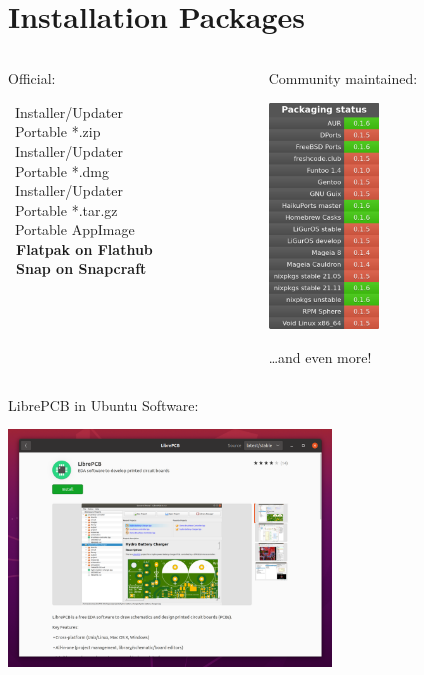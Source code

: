 \section{Installation Packages}

\begin{frame}{\secname}

  \begin{columns}
    \begin{column}{.3\textwidth}
      \centering
      Official: \smallskip

      \faWindows\ Installer/Updater \\
      \faWindows\ Portable *.zip \\
      \faApple\ Installer/Updater \\
      \faApple\ Portable *.dmg \\
      \faLinux\ Installer/Updater \\
      \faLinux\ Portable *.tar.gz \\
      \faLinux\ Portable AppImage \\
      {\bfseries\faLinux\ Flatpak on Flathub} \\
      {\bfseries\faLinux\ Snap on Snapcraft} \\
    \end{column}

    \begin{column}{.6\textwidth}
      \centering
      \faRocket \hspace{0.05em} Community maintained: \smallskip

      \includegraphics[height=6cm]{images/packaging_status.png}

      \ldots and even more!
    \end{column}
  \end{columns}

\end{frame}

\begin{frame}{\secname}
  LibrePCB in Ubuntu Software:
  \begin{center}
    \includegraphics[height=6.3cm]{images/ubuntu_store.png}
  \end{center}
\end{frame}
